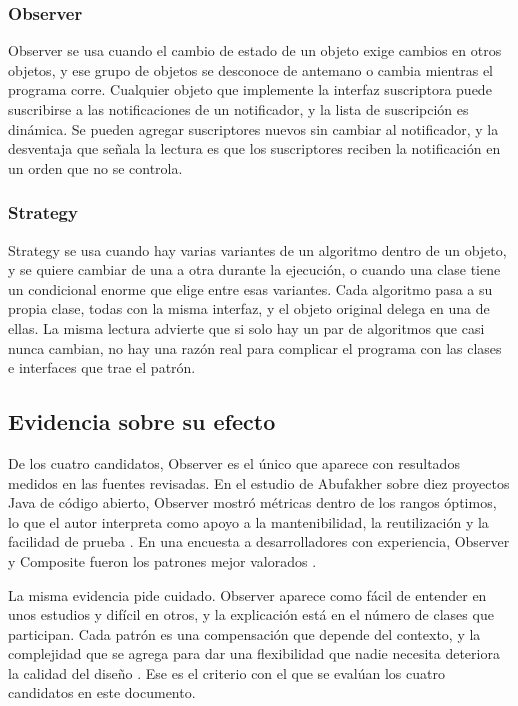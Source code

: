 \subsubsection{Observer}

Observer se usa cuando el cambio de estado de un objeto exige cambios en otros objetos, y ese grupo de objetos se desconoce de antemano o cambia mientras el programa corre. Cualquier objeto que implemente la interfaz suscriptora puede suscribirse a las notificaciones de un notificador, y la lista de suscripción es dinámica. Se pueden agregar suscriptores nuevos sin cambiar al notificador, y la desventaja que señala la lectura es que los suscriptores reciben la notificación en un orden que no se controla.

\subsubsection{Strategy}

Strategy se usa cuando hay varias variantes de un algoritmo dentro de un objeto, y se quiere cambiar de una a otra durante la ejecución, o cuando una clase tiene un condicional enorme que elige entre esas variantes. Cada algoritmo pasa a su propia clase, todas con la misma interfaz, y el objeto original delega en una de ellas. La misma lectura advierte que si solo hay un par de algoritmos que casi nunca cambian, no hay una razón real para complicar el programa con las clases e interfaces que trae el patrón.

\subsection{Evidencia sobre su efecto}

De los cuatro candidatos, Observer es el único que aparece con resultados medidos en las fuentes revisadas. En el estudio de Abufakher sobre diez proyectos Java de código abierto, Observer mostró métricas dentro de los rangos óptimos, lo que el autor interpreta como apoyo a la mantenibilidad, la reutilización y la facilidad de prueba . En una encuesta a desarrolladores con experiencia, Observer y Composite fueron los patrones mejor valorados .

La misma evidencia pide cuidado. Observer aparece como fácil de entender en unos estudios y difícil en otros, y la explicación está en el número de clases que participan. Cada patrón es una compensación que depende del contexto, y la complejidad que se agrega para dar una flexibilidad que nadie necesita deteriora la calidad del diseño . Ese es el criterio con el que se evalúan los cuatro candidatos en este documento.

